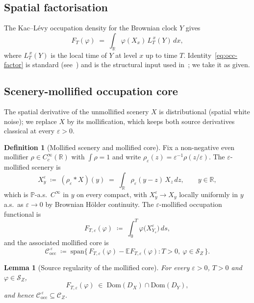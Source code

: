 \documentclass[11pt,reqno]{amsart}
\theoremstyle{plain}
\newtheorem{lemma}[theorem]{Lemma}
\theoremstyle{definition}
\newtheorem{definition}[theorem]{Definition}
\theoremstyle{remark}
\newcommand{\R}{\mathbb{R}}
\newcommand{\E}{\mathbb{E}}
\newcommand{\Prob}{\mathbb{P}}
\newcommand{\Dom}{\mathrm{Dom}}
\newcommand{\IBM}{Z}
\begin{document}
\subsection*{Spatial factorisation}

The Kac--L\'evy occupation density for the Brownian clock $Y$ gives
\begin{equation}\label{eq:occ-factor}
  F_T(\varphi)
  \;=\;\int_{\R}\varphi(X_x)\,L_T^{\,x}(Y)\,dx,
\end{equation}
where $L_T^{\,x}(Y)$ is the local time of $Y$ at level $x$ up to time
$T$. Identity~\eqref{eq:occ-factor} is standard
(see~\cite{RevuzYor,BorodinSalminen}) and is the structural input
used in~\cite{Fontes-IBMchaos}; we take it as given.

\subsection*{Scenery-mollified occupation core}

The spatial derivative of the unmollified scenery $X$ is distributional
(spatial white noise); we replace $X$ by its mollification, which keeps
both source derivatives classical at every $\varepsilon>0$.

\begin{definition}[Mollified scenery and mollified core]
\label{def:mollified}
Fix a non-negative even mollifier $\rho\in C_c^\infty(\R)$ with
$\int\rho=1$ and write $\rho_\varepsilon(z)=\varepsilon^{-1}\rho(z/\varepsilon)$.
The $\varepsilon$-mollified scenery is
\[
  X^{\varepsilon}_y \;\coloneqq\; (\rho_\varepsilon*X)(y)
  \;=\;\int_{\R}\rho_\varepsilon(y-z)\,X_z\,dz,
  \qquad y\in\R,
\]
which is $\Prob$-a.s.\ $C^{\infty}$ in $y$ on every compact, with
$X^{\varepsilon}_y\to X_y$ locally uniformly in $y$ a.s.\ as
$\varepsilon\to 0$ by Brownian H\"older continuity. The
$\varepsilon$-mollified occupation functional is
\[
  F_{T,\varepsilon}(\varphi)
  \;\coloneqq\;\int_0^T\varphi\bigl(X^{\varepsilon}_{Y_s}\bigr)\,ds,
\]
and the associated mollified core is
\[
  \mathcal C_{\mathrm{occ}}^{\,\varepsilon}
  \;\coloneqq\;\mathrm{span}\bigl\{\,F_{T,\varepsilon}(\varphi)-
      \E F_{T,\varepsilon}(\varphi):T>0,\ \varphi\in\mathscr S_\IBM\,\bigr\}.
\]
\end{definition}

\begin{lemma}[Source regularity of the mollified core]
\label{lem:moll-domain}
For every $\varepsilon>0$, $T>0$ and $\varphi\in\mathscr S_\IBM$,
\[
  F_{T,\varepsilon}(\varphi)\;\in\;\Dom(D_X)\cap\Dom(D_Y),
\]
and hence $\mathcal C_{\mathrm{occ}}^{\,\varepsilon}\subseteq\mathcal C_\IBM$.
\end{lemma}
\end{document}
